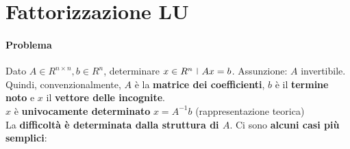 \documentclass[10pt]{book}
\begin{document}
\section{Fattorizzazione LU}
\paragraph{Problema} Dato $A \in R^{n \times n}, b \in R^n$, determinare $x \in R^n\:\:\vline\:\: Ax = b$. Assunzione: $A$ invertibile.\\
Quindi, convenzionalmente, $A$ è la \textbf{matrice dei coefficienti}, $b$ è il \textbf{termine noto} e $x$ il \textbf{vettore delle incognite}.\\
$x$ è \textbf{univocamente determinato} $x = A^{-1}b$ (rappresentazione teorica)\\
La \textbf{difficoltà è determinata dalla struttura di $A$}. Ci sono \textbf{alcuni casi più semplici}:
\end{document}
